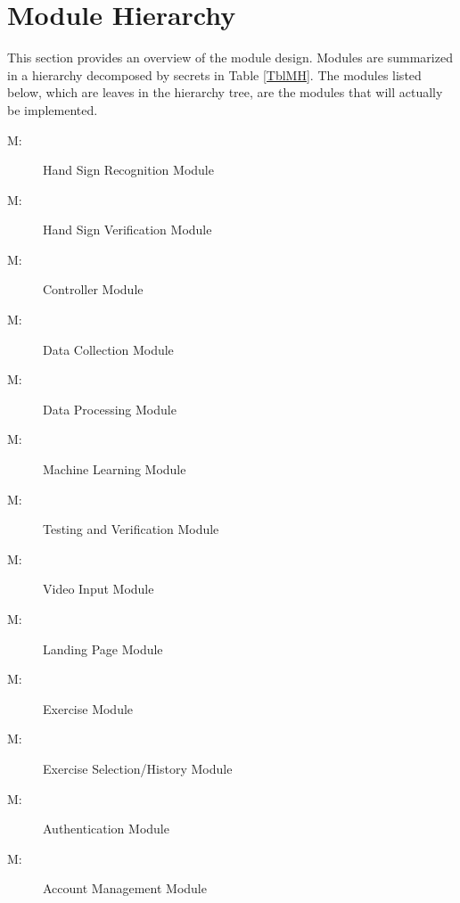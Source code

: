 \documentclass[12pt, titlepage]{article}
\newcounter{mnum}
\newcommand{\mthemnum}{M\themnum}
\begin{document}
\section{Module Hierarchy} \label{SecMH}

This section provides an overview of the module design. Modules are summarized
in a hierarchy decomposed by secrets in Table \ref{TblMH}. The modules listed
below, which are leaves in the hierarchy tree, are the modules that will
actually be implemented.

\begin{description}
\item [ \mthemnum \label{m1}:] Hand Sign Recognition Module
\item [ \mthemnum \label{m2}:] Hand Sign Verification Module
\item [ \mthemnum \label{m3}:] Controller Module
\item [ \mthemnum \label{m4}:] Data Collection Module
\item [ \mthemnum \label{m5}:] Data Processing Module
\item [ \mthemnum \label{m6}:] Machine Learning Module
\item [ \mthemnum \label{m7}:] Testing and Verification Module
\item [ \mthemnum \label{m8}:] Video Input Module
\item [ \mthemnum \label{m9}:] Landing Page Module
\item [ \mthemnum \label{m10}:] Exercise Module
\item [ \mthemnum \label{m11}:] Exercise Selection/History Module
\item [ \mthemnum \label{m12}:] Authentication Module
\item [ \mthemnum \label{m13}:] Account Management Module
\end{description}
\end{document}
